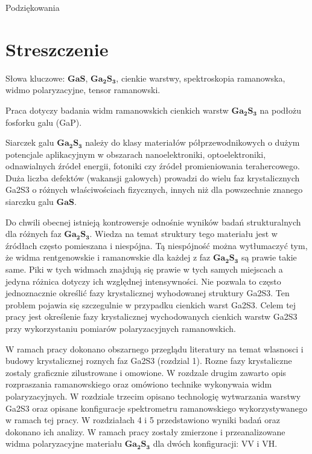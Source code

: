 Podziękowania

\newpage

\section*{Streszczenie}

Słowa kluczowe: $\mathbf{GaS}$, $\mathbf{Ga_{2}S_{3}}$, cienkie warstwy, spektroskopia ramanowska, widmo polaryzacyjne, tensor ramanowski.

\vspace{10mm}

Praca dotyczy badania widm ramanowskich cienkich warstw $\mathbf{Ga_{2}S_{3}}$ na podłożu fosforku galu (GaP).

Siarczek galu $\mathbf{Ga_{2}S_{3}}$ należy do klasy materiałów półprzewodnikowych o dużym potencjale aplikacyjnym w obszarach nanoelektroniki, optoelektroniki, odnawialnych źródeł energii, fotoniki czy źródeł promieniowania terahercowego. Duża liczba defektów (wakansji galowych) prowadzi do wielu faz krystalicznych Ga2S3 o różnych właściwościach fizycznych, innych niż dla powszechnie znanego siarczku galu $\mathbf{GaS}$.

Do chwili obecnej istnieją kontrowersje odnośnie wyników badań strukturalnych dla różnych faz $\mathbf{Ga_{2}S_{3}}$. Wiedza na temat struktury tego materiału jest w źródłach często pomieszana i niespójna. Tą niespójność można wytłumaczyć tym, że widma rentgenowskie i ramanowskie dla każdej z faz $\mathbf{Ga_{2}S_{3}}$ są prawie takie same. Piki w tych widmach znajdują się prawie w tych samych miejscach a jedyna różnica dotyczy ich względnej intensywności. Nie pozwala to często jednoznacznie określić fazy krystalicznej wyhodowanej struktury Ga2S3. Ten problem pojawia się szczegulnie w przypadku cienkich warst Ga2S3. Celem tej pracy jest określenie fazy krystalicznej wychodowanych cienkich warstw Ga2S3 przy wykorzystaniu pomiarów polaryzacyjnych ramanowskich.

W ramach pracy dokonano obszarnego przeglądu literatury na temat wlasnosci i budowy krystalicznej roznych faz Ga2S3 (rozdzial 1). Rozne fazy krystaliczne zostaly graficznie zilustrowane i omowione. W rozdzale drugim zawarto opis rozpraszania ramanowskiego oraz omówiono technike wykonywaia widm polaryzacyjnych. W rozdziale trzecim opisano technologię wytwarzania warstwy Ga2S3 oraz opisane konfiguracje spektrometru ramanowskiego wykorzystywanego w ramach tej pracy. W rozdziałach 4 i 5 przedstawiono wyniki badań oraz dokonano ich analizy. W ramach pracy zostały zmierzone i przeanalizowane widma polaryzacyjne materiału $\mathbf{Ga_{2}S_{3}}$ dla dwóch konfiguracji: VV i VH.

